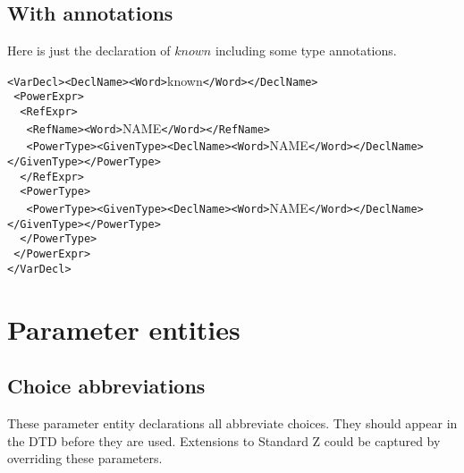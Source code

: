 \documentclass[a4paper,10pt]{article}
\begin{document}
\subsection{With annotations}

Here is just the declaration of $known$ including some type annotations.

\begin{zed}
\verb&<VarDecl><DeclName><Word>&known\verb&</Word></DeclName>&\\
\verb& <PowerExpr>&\\
\verb&  <RefExpr>&\\
\verb&   <RefName><Word>&NAME\verb&</Word></RefName>&\\
\verb&   <PowerType><GivenType><DeclName><Word>&NAME\verb&</Word></DeclName></GivenType></PowerType>&\\
\verb&  </RefExpr>&\\
\verb&  <PowerType>&\\
\verb&   <PowerType><GivenType><DeclName><Word>&NAME\verb&</Word></DeclName></GivenType></PowerType>&\\
\verb&  </PowerType>&\\
\verb& </PowerExpr>&\\
\verb&</VarDecl>&\\
\end{zed}

\section{Parameter entities}

\subsection{Choice abbreviations}\label{Abbreviations}

These parameter entity declarations all abbreviate choices.
They should appear in the DTD before they are used.
Extensions to Standard Z could be captured by overriding these parameters.
\end{document}
